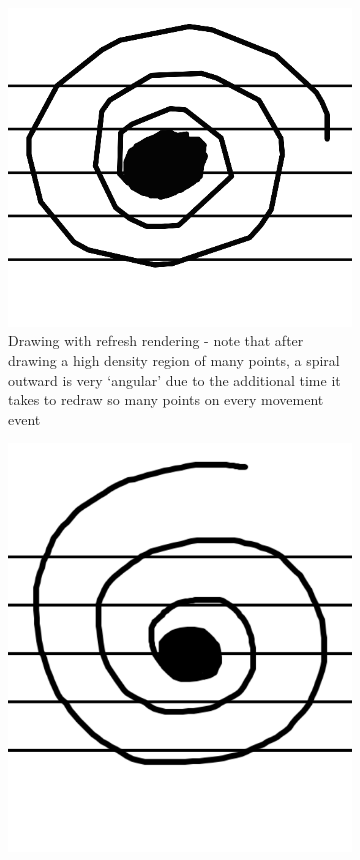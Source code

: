 \begin{figure}[H]
    \centering

    \begin{subfigure}[b]{.49\linewidth}
        \centering
      \includegraphics[width=\linewidth]{gfx/implementation/lag-stave.png}
      \caption{Drawing with refresh rendering - note that after drawing a high density region of many points, a spiral outward is very `angular' due to the additional time it takes to redraw so many points on every movement event }
      \label{fig:drawing-lag-rough}
    \end{subfigure}
    \begin{subfigure}[b]{.49\linewidth}
        \centering
      \includegraphics[width=\linewidth]{gfx/implementation/nolag-stave.png}

\end{subfigure}
\end{figure}

